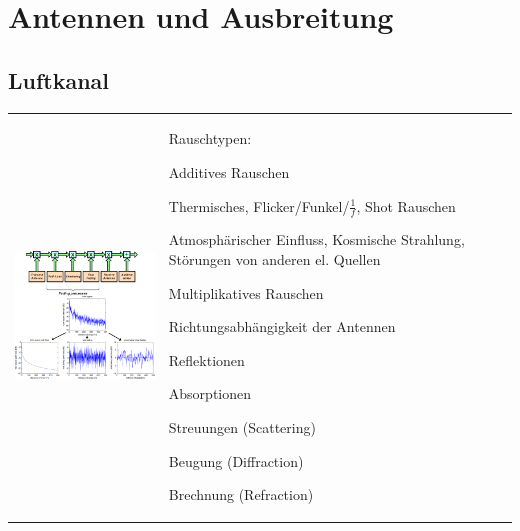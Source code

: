 \section{Antennen und Ausbreitung }
\subsection{Luftkanal }
\begin{tabular}{ll}
\parbox{8cm}{
    \includegraphics[width=7cm]{./bilder/antennas-noisetypes.png}}
    
& \parbox{10cm}{
    Rauschtypen:
    \begin{liste}
        \item Additives Rauschen
        \begin{liste}
            \item Thermisches, Flicker/Funkel/$\frac{1}{f}$, Shot Rauschen
            \item Atmosphärischer Einfluss, Kosmische Strahlung, Störungen von
            anderen el. Quellen
        \end{liste}
        \item Multiplikatives Rauschen
        \begin{liste}
            \item Richtungsabhängigkeit der Antennen
            \item Reflektionen
            \item Absorptionen
            \item Streuungen (Scattering)
            \item Beugung (Diffraction)
            \item Brechnung (Refraction)
        \end{liste}
    \end{liste}}
\end{tabular}

